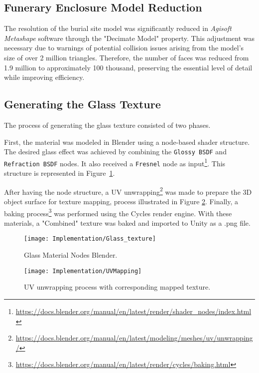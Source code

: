 \subsection{Funerary Enclosure Model Reduction}
The resolution of the burial site model was significantly reduced in \emph{Agisoft Metashape} software through the "Decimate Model" property.
This adjustment was necessary due to warnings of potential collision issues arising from the model's size of over 2 million triangles. 
Therefore, the number of faces was reduced from 1.9 million to approximately 100 thousand, preserving the essential level of detail while improving efficiency.

\subsection{Generating the Glass Texture}
\label{sec:glass_texture}
The process of generating the glass texture consisted of two phases.  

First, the material was modeled in Blender using a node-based shader structure. The desired glass effect was achieved by combining the \texttt{Glossy BSDF} and \texttt{Refraction BSDF} nodes. It also received a \texttt{Fresnel} node as input\footnote{\url{https://docs.blender.org/manual/en/latest/render/shader_nodes/index.html}}. This structure is represented in Figure~\ref{fig:glass_texture}.  

After having the node structure, a UV unwrapping\footnote {\url{https://docs.blender.org/manual/en/latest/modeling/meshes/uv/unwrapping/}} was made to prepare the \gls{3D} object surface for texture mapping, process illustrated in Figure \ref{fig:uv_process}.
 Finally, a baking process\footnote{\url{https://docs.blender.org/manual/en/latest/render/cycles/baking.html}} was performed using the Cycles render engine.
With these materials, a "Combined" texture was baked and imported to Unity as a .png file.

 \begin{figure}[h!]
    \centering
    \texttt{[image: Implementation/Glass\_texture]}
    \caption{Glass Material Nodes Blender.}
    \label{fig:glass_texture}    
\end{figure}


\begin{figure}[h!]
    \centering
    \texttt{[image: Implementation/UVMapping]}
    \caption{UV unwrapping process with corresponding mapped texture.}
    \label{fig:uv_process}
\end{figure}


